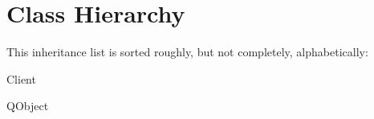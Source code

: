\section{Class Hierarchy}
This inheritance list is sorted roughly, but not completely, alphabetically\+:\begin{DoxyCompactList}
\item Client\begin{DoxyCompactList}
\item {}
\end{DoxyCompactList}
\item Q\+Object\begin{DoxyCompactList}
\item {}
\item {}
\begin{DoxyCompactList}
\item {}
\item {}
\item {}
\end{DoxyCompactList}
\end{DoxyCompactList}
\end{DoxyCompactList}
